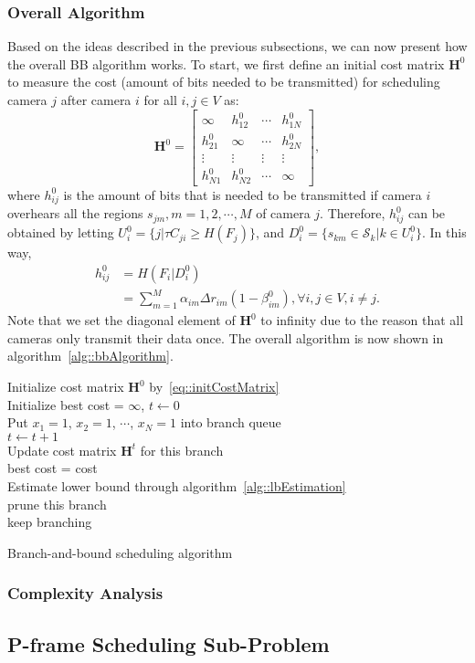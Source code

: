 \subsubsection{Overall Algorithm}
Based on the ideas described in the previous subsections, we can now present how the overall BB algorithm works.
To start, we first define an initial cost matrix $\mathbf{H}^0$ to measure the cost (amount of bits needed to be transmitted) for scheduling camera $j$ after camera $i$ for all $i,j \in V$ as:
\begin{equation}
\mathbf{H}^0 = \left[ \begin{array}{cccc}
\infty &h_{12}^0 &\cdots &h_{1N}^0 \\
h_{21}^0 &\infty &\cdots &h_{2N}^0 \\
\vdots &\vdots &\vdots &\vdots \\
h_{N1}^0 &h_{N2}^0 &\cdots &\infty
\end{array} \right],
\label{eq::initCostMatrix}
\end{equation}
where $h_{ij}^0$ is the amount of bits that is needed to be transmitted if camera $i$ overhears all the regions ${s_{jm}, m=1,2,\cdots,M}$ of camera $j$.
Therefore, $h_{ij}^0$ can be obtained by letting ${U_i^0=\{ j|\tau C_{ji} \geq H(F_j)\}}$, and $D_i^0 = \{s_{km}\in \mathcal{S}_k | k \in U_i^0\}$.
In this way,
\begin{align}
h_{ij}^0 &= H(F_i|D_i^0) \nonumber \\
         &= \sum_{m=1}^M \alpha_{im}\Delta r_{im} (1-\beta_{im}^0), \forall i,j \in V, i \neq j.
\end{align}
Note that we set the diagonal element of $\mathbf{H}^0$ to infinity due to the reason that all cameras only transmit their data once.
The overall algorithm is now shown in algorithm~\ref{alg::bbAlgorithm}.
\IncMargin{1em}
\begin{algorithm}[]
 \SetAlgoLined
 \BlankLine
 Initialize cost matrix $\mathbf{H}^0$ by~\eqref{eq::initCostMatrix}\\
 Initialize best cost = $\infty$, $t \gets 0$\\
 Put $x_1 = 1$, $x_2 = 1$, $\cdots$, $x_N=1$ into branch queue\\
 {
 	$t \gets t+1$ \\
 	Update cost matrix $\mathbf{H}^t$ for this branch\\
  	{
  			{best cost = cost\\}
 	}
 	{
 		Estimate lower bound through algorithm~\ref{alg::lbEstimation} \\
		{
  			prune this branch\\
 		}
 		{
 			keep branching\\
 		} 	
 	}
 }
 \caption{\label{alg::bbAlgorithm}Branch-and-bound scheduling algorithm}
\end{algorithm}
\DecMargin{1em}
%
\subsubsection{Complexity Analysis}
%
\subsection{P-frame Scheduling Sub-Problem}
